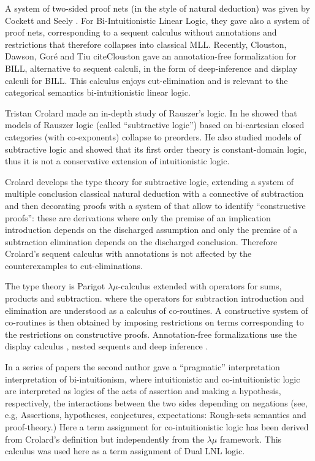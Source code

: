 A system of two-sided proof nets (in the style of natural deduction) was given by Cockett and Seely \cite{Cockett:1997}.
For Bi-Intuitionistic Linear Logic, they gave also a system of proof nets, corresponding to a sequent calculus without 
annotations and restrictions that therefore collapses into classical MLL. 
Recently, Clouston, Dawson, Goré and Tiu cite{Clouston} gave an annotation-free formalization for BILL, alternative to sequent calculi, in the form of deep-inference and display calculi for BILL. This calculus enjoys cut-elimination and is 
relevant to the categorical semantics bi-intuitionistic linear logic.
 
Tristan Crolard \cite{Crolard:2001,Crolard:2004} made an in-depth study of Rauszer's logic. In \cite{Crolard:2001} he showed that models of Rauszer logic (called ``subtractive logic'') based on bi-cartesian closed categories (with co-exponents) collapse to preorders.
He also studied models of subtractive logic and showed that its first order theory is constant-domain logic, thus it is not 
a conservative extension of intuitionistic logic.

Crolard \cite{Crolard:2004} develops the type theory for subtractive logic, extending a system of multiple conclusion
classical natural deduction with a connective of subtraction and then decorating proofs with a system of \cite{annotations
of dependencies} that allow to identify ``constructive proofs'': these are derivations where only the premise of an implication introduction depends on the discharged assumption and only the premise of a subtraction elimination depends on the discharged conclusion. Therefore Crolard's sequent calculus with annotations is not affected by the 
counterexamples to cut-eliminations. 

The type theory is Parigot $\lambda\mu$-calculus extended with operators for sums, products and subtraction. 
where the operators for subtraction introduction and elimination are understood as a calculus of co-routines.
A constructive system of co-routines is then obtained by imposing restrictions on terms corresponding to the restrictions
 on constructive proofs.  Annotation-free formalizations use the display calculus \cite{Gore:2000}, nested sequents
\cite{GorePostnieceTiu:2008} and deep inference \cite{Postniece:2009}.

In a series of papers the second author gave a ``pragmatic'' interpretation interpretation of bi-intuitionism, where intuitionistic and co-intuitionistic logic are interpreted as logics of the acts of assertion and making a hypothesis, 
respectively, the interactions between the two sides depending on negations (see, e.g, \cite{Bellin:2014} 
Assertions, hypotheses, conjectures, expectations: Rough-sets semantics and proof-theory.)
Here a term assignment for co-intuitionistic logic has been derived from Crolard's definition but independently 
from the $\lambda\mu$ framework. This calculus was used here as a term assignment of Dual LNL logic.  

